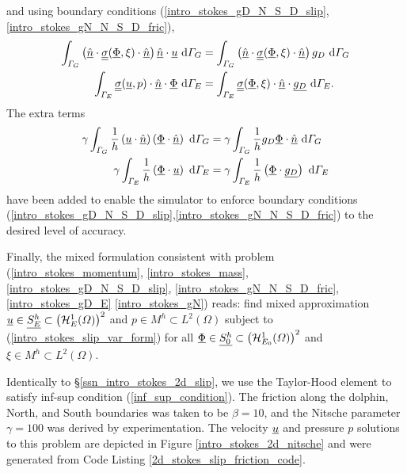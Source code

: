 and using boundary conditions (\ref{intro_stokes_gD_N_S_D_slip},\ref{intro_stokes_gN_N_S_D_fric}), 
\begin{align*}
  \int_{\varGamma_G} \left( \underline{\hat{n}} \cdot \underline{\underline{\sigma}}(\underline{\Phi},\xi) \cdot \underline{\hat{n}} \right) \underline{\hat{n}} \cdot \underline{u}  \ \mathrm{d}\varGamma_G &= \int_{\varGamma_G} \left( \underline{\hat{n}} \cdot \underline{\underline{\sigma}}(\underline{\Phi},\xi) \cdot \underline{\hat{n}} \right) g_D \ \mathrm{d}\varGamma_G \\
  \int_{\varGamma_E} \underline{\underline{\sigma}}(\underline{u},p) \cdot \underline{\hat{n}} \cdot \underline{\Phi} \ \mathrm{d}\varGamma_E &= \int_{\varGamma_E} \underline{\underline{\sigma}}(\underline{\Phi},\xi) \cdot \underline{\hat{n}} \cdot \underline{g_D} \ \mathrm{d}\varGamma_E.
\end{align*}
The extra terms
\begin{align*}
  \gamma \int_{\varGamma_G} \frac{1}{h} \left( \underline{u} \cdot \underline{\hat{n}} \right) \left( \underline{\Phi} \cdot \underline{\hat{n}} \right) \ \mathrm{d}\varGamma_G &= \gamma \int_{\varGamma_G} \frac{1}{h} g_D \underline{\Phi} \cdot \underline{\hat{n}} \ \mathrm{d}\varGamma_G \\
  \gamma \int_{\varGamma_E} \frac{1}{h} \left( \underline{\Phi} \cdot \underline{u} \right) \ \mathrm{d}\varGamma_E &= \gamma \int_{\varGamma_E} \frac{1}{h} \left( \underline{\Phi} \cdot \underline{g_D} \right) \ \mathrm{d}\varGamma_E
\end{align*}
have been added to enable the simulator to enforce boundary conditions (\ref{intro_stokes_gD_N_S_D_slip},\ref{intro_stokes_gN_N_S_D_fric}) to the desired level of accuracy.  

Finally, the mixed formulation  consistent with problem (\ref{intro_stokes_momentum}, \ref{intro_stokes_mass}, \ref{intro_stokes_gD_N_S_D_slip}, \ref{intro_stokes_gN_N_S_D_fric}, \ref{intro_stokes_gD_E} \ref{intro_stokes_gN})  reads: find mixed approximation $\underline{u} \in \underline{S_E^h} \subset \left( \mathcal{H}_E^1(\varOmega) \right)^2$ and $p \in M^h \subset L^2(\Omega)$ subject to (\ref{intro_stokes_slip_var_form}) for all $\underline{\Phi} \in \underline{S_0^h} \subset \left( \mathcal{H}_{E_0}^1(\varOmega) \right)^2$ and $\xi \in M^h \subset L^2(\Omega)$.

Identically to \S \ref{ssn_intro_stokes_2d_slip}, we use the Taylor-Hood element to satisfy inf-sup condition (\ref{inf_sup_condition}).  The friction along the dolphin, North, and South boundaries was taken to be $\beta = 10$, and the Nitsche parameter $\gamma = 100$ was derived by experimentation.  The velocity $\underline{u}$ and pressure $p$ solutions to this problem are depicted in Figure \ref{intro_stokes_2d_nitsche} and were generated from Code Listing \ref{2d_stokes_slip_friction_code}.

